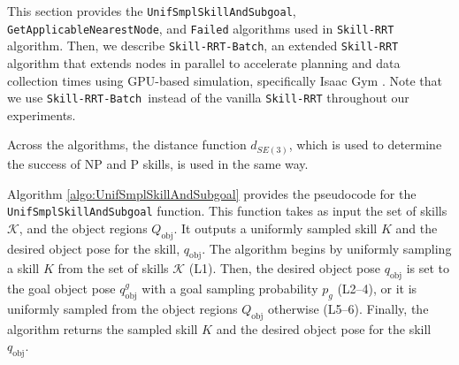 \newcommand{\gpuskillrrt}{\texttt{Skill-RRT-Batch}}

This section provides the \texttt{UnifSmplSkillAndSubgoal}, \texttt{GetApplicableNearestNode}, and \texttt{Failed} algorithms used in \texttt{Skill-RRT} algorithm. Then, we describe \gpuskillrrt, an extended \texttt{Skill-RRT} algorithm that extends nodes in parallel to accelerate planning and data collection times using GPU-based simulation, specifically Isaac Gym \cite{makoviychuk2021isaac}. Note that we use \gpuskillrrt~instead of the vanilla \texttt{Skill-RRT} throughout our experiments.

Across the algorithms, the distance function \( d_{SE(3)} \), which is used to determine the success of NP and P skills, is used in the same way.



Algorithm \ref{algo:UnifSmplSkillAndSubgoal} provides the pseudocode for the \texttt{UnifSmplSkillAndSubgoal} function. This function takes as input the set of skills $\mathcal{K}$, and the object regions $Q_\text{obj}$. It outputs a uniformly sampled skill $K$ and the desired object pose for the skill, $q_\text{obj}$. The algorithm begins by uniformly sampling a skill $K$ from the set of skills $\mathcal{K}$ (L1). Then, the desired object pose $q_\text{obj}$ is set to the goal object pose $q^g_\text{obj}$ with a goal sampling probability $p_g$ (L2–4), or it is uniformly sampled from the object regions $Q_\text{obj}$ otherwise (L5–6). Finally, the algorithm returns the sampled skill $K$ and the desired object pose for the skill $q_\text{obj}$.



